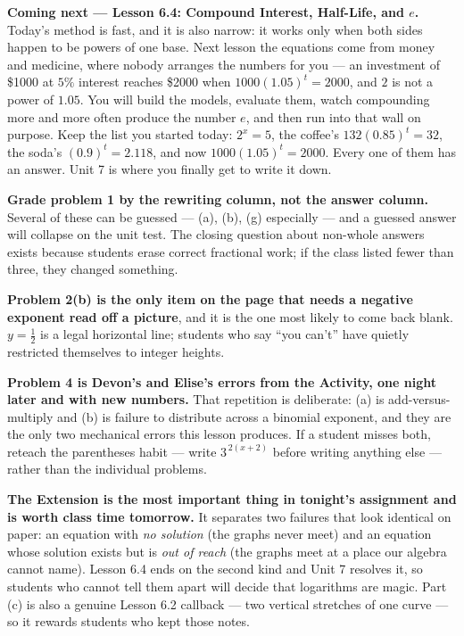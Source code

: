 \documentclass[10pt]{article}
\begin{document}
\begin{spiralbox}
\textbf{Coming next --- Lesson 6.4: Compound Interest, Half-Life, and $e$.} Today's method is fast, and
it is also narrow: it works only when both sides happen to be powers of one base. Next lesson the
equations come from money and medicine, where nobody arranges the numbers for you --- an investment of
\$1000 at $5\%$ interest reaches \$2000 when $1000(1.05)^{t}=2000$, and $2$ is not a power of $1.05$.
You will build the models, evaluate them, watch compounding more and more often produce the number
$e$, and then run into that wall on purpose. Keep the list you started today: $2^{x}=5$, the coffee's
$132(0.85)^{t}=32$, the soda's $(0.9)^{t}=2.118$, and now $1000(1.05)^{t}=2000$. Every one of them has
an answer. Unit 7 is where you finally get to write it down.
\end{spiralbox}

\begin{teachernote}
\textbf{Grade problem 1 by the rewriting column, not the answer column.} Several of these can be
guessed --- (a), (b), (g) especially --- and a guessed answer will collapse on the unit test. The
closing question about non-whole answers exists because students erase correct fractional work; if the
class listed fewer than three, they changed something.

\textbf{Problem 2(b) is the only item on the page that needs a negative exponent read off a picture},
and it is the one most likely to come back blank. $y=\frac12$ is a legal horizontal line; students who
say ``you can't'' have quietly restricted themselves to integer heights.

\textbf{Problem 4 is Devon's and Elise's errors from the Activity, one night later and with new
numbers.} That repetition is deliberate: (a) is add-versus-multiply and (b) is failure to distribute
across a binomial exponent, and they are the only two mechanical errors this lesson produces. If a
student misses both, reteach the parentheses habit --- write $3^{\,2(x+2)}$ before writing anything
else --- rather than the individual problems.

\textbf{The Extension is the most important thing in tonight's assignment and is worth class time
tomorrow.} It separates two failures that look identical on paper: an equation with \emph{no solution}
(the graphs never meet) and an equation whose solution exists but is \emph{out of reach} (the graphs
meet at a place our algebra cannot name). Lesson 6.4 ends on the second kind and Unit 7 resolves it, so
students who cannot tell them apart will decide that logarithms are magic. Part (c) is also a genuine
Lesson 6.2 callback --- two vertical stretches of one curve --- so it rewards students who kept those
notes.
\end{teachernote}
\end{document}

